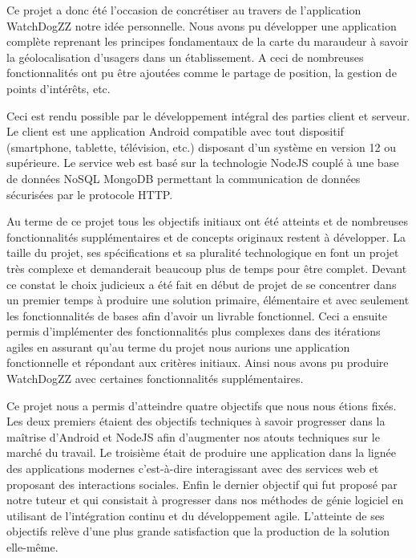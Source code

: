 
Ce projet a donc été l’occasion de concrétiser au travers de l’application WatchDogZZ notre idée personnelle. Nous avons pu développer une application complète reprenant les principes fondamentaux de la carte du maraudeur à savoir la géolocalisation d’usagers dans un établissement. A ceci de nombreuses fonctionnalités ont pu être ajoutées comme le partage de position, la gestion de points d’intérêts, etc.

Ceci est rendu possible par le développement intégral des parties client et serveur. Le client est une application Android compatible avec tout dispositif (smartphone, tablette, télévision, etc.) disposant d’un système en version 12 ou supérieure. Le service web est basé sur la technologie NodeJS couplé à une base de données NoSQL MongoDB permettant la communication de données sécurisées par le protocole HTTP.

Au terme de ce projet tous les objectifs initiaux ont été atteints et de nombreuses fonctionnalités supplémentaires et de concepts originaux restent à développer. La taille du projet, ses spécifications et sa pluralité technologique en font un projet très complexe et demanderait beaucoup plus de temps pour être complet. Devant ce constat le choix judicieux a été fait en début de projet de se concentrer dans un premier temps à produire une solution primaire, élémentaire et avec seulement les fonctionnalités de bases afin d’avoir un livrable fonctionnel. Ceci a ensuite permis d’implémenter des fonctionnalités plus complexes dans des itérations agiles en assurant qu’au terme du projet nous aurions une application fonctionnelle et répondant aux critères initiaux. Ainsi nous avons pu produire WatchDogZZ avec certaines fonctionnalités supplémentaires.

Ce projet nous a permis d’atteindre quatre objectifs que nous nous étions fixés. Les deux premiers étaient des objectifs techniques à savoir progresser dans la maîtrise d’Android et NodeJS afin d’augmenter nos atouts techniques sur le marché du travail. Le troisième était de produire une application dans la lignée des applications modernes c’est-à-dire interagissant avec des services web et proposant des interactions sociales. Enfin le dernier objectif qui fut proposé par notre tuteur et qui consistait à progresser dans nos méthodes de génie logiciel en utilisant de l’intégration continu et du développement agile. L’atteinte de ses objectifs relève d’une plus grande satisfaction que la production de la solution elle-même.

